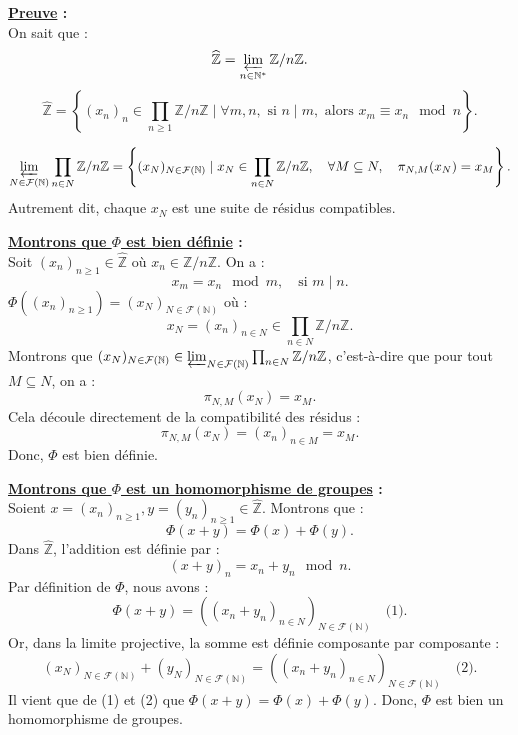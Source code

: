 \documentclass[a4paper, 14pt]{report}
\newcommand{\divides}{\mid}
\begin{document}
\begin{onehalfspace}
{			\textbf{\underline{Preuve} :}\\
			
			On sait que :
			\[
			\widehat{\mathbb{Z}} = \varprojlim_{n \in \mathbb{N}^*} \mathbb{Z}/n\mathbb{Z}.
			\]
			\[
			\widehat{\mathbb{Z}} = \left\{ (x_n)_n \in \prod_{n \geq 1} \mathbb{Z}/n\mathbb{Z} \mid \forall m, n, \text{ si } n \mid m, \text{ alors } x_m \equiv x_n \mod n \right\}.
			\]
			
			
			\[
			\varprojlim_{N \in \mathcal{F}(\mathbb{N})} \prod_{n \in N} \mathbb{Z}/n\mathbb{Z} = \left\{ (x_N)_{N \in \mathcal{F}(\mathbb{N})} \mid x_N \in \prod_{n \in N} \mathbb{Z}/n\mathbb{Z}, \quad \forall M \subseteq N, \quad \pi_{N,M}(x_N) = x_M \right\}.
			\]
			Autrement dit, chaque $x_N$ est une suite de résidus compatibles.
			
			\textbf{\underline{ Montrons que $\Phi$ est bien définie} :}\\
			Soit $(x_n)_{n \geq 1} \in \widehat{\mathbb{Z}}$  où $x_n \in \mathbb{Z}/n\mathbb{Z}$. On a :
			\[
			x_m = x_n \mod m, \quad \text{si } m \divides n.
			\]
			$\Phi ((x_n)_{n \geq 1}) = (x_N)_{N \in \mathcal{F}(\mathbb{N})}$  où :
			\[
			x_N = (x_n)_{n \in N} \in \prod_{n \in N} \mathbb{Z}/n\mathbb{Z}.
			\]
			Montrons que $(x_N)_{N \in \mathcal{F}(\mathbb{N})} \in \varprojlim_{N \in \mathcal{F}(\mathbb{N})} \prod_{n \in N} \mathbb{Z}/n\mathbb{Z}$, c'est-à-dire que pour tout $M \subseteq N$, on a :
			\[
			\pi_{N,M}(x_N) = x_M.
			\]
			Cela découle directement de la compatibilité des résidus :
			\[
			\pi_{N,M}(x_N) = (x_n)_{n \in M} = x_M.
			\]
			Donc, $\Phi$ est bien définie.
			
			\textbf{\underline{Montrons que $\Phi$ est un homomorphisme de groupes} :}\\
			Soient $x=(x_n)_{n \geq 1}, y=(y_n)_{n \geq 1} \in \widehat{\mathbb{Z}}$. Montrons que :
			\[
			\Phi(x + y) = \Phi(x) + \Phi(y).
			\]
			Dans $\widehat{\mathbb{Z}}$, l’addition est définie par :
			\[
			(x + y)_n = x_n + y_n \mod n.
			\]
			Par définition de $\Phi$, nous avons :
			\[
			\Phi(x + y) = ( (x_n + y_n)_{n \in N} )_{N \in \mathcal{F}(\mathbb{N})} \quad \text{(1)}.
			\]
			Or, dans la limite projective, la somme est définie composante par composante :
			\[
			(x_N)_{N \in \mathcal{F}(\mathbb{N})} + (y_N)_{N \in \mathcal{F}(\mathbb{N})} = ( (x_n + y_n)_{n \in N} )_{N \in \mathcal{F}(\mathbb{N})} \quad \text{(2)}.
			\]	
			Il vient que de (1) et (2) que \(	\Phi(x + y) = \Phi(x) + \Phi(y) \). Donc, $\Phi$ est bien un homomorphisme de groupes.
			
}
\end{onehalfspace}
\end{document}
